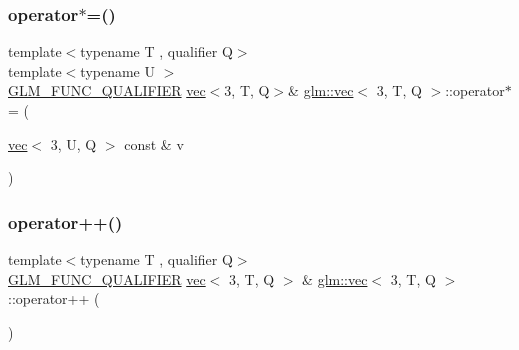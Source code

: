 \mbox{\label{structglm_1_1vec_3_013_00_01_t_00_01_q_01_4_a20170b8b71ce0a479ea43b5d4690a1a5}} 
\subsubsection{\texorpdfstring{operator$\ast$=()}{operator*=()}\hspace{0.1cm}{\footnotesize\ttfamily [6/6]}}
{\footnotesize\ttfamily template$<$typename T , qualifier Q$>$ \\
template$<$typename U $>$ \\
\mbox{\hyperlink{setup_8hpp_a33fdea6f91c5f834105f7415e2a64407}{G\+L\+M\+\_\+\+F\+U\+N\+C\+\_\+\+Q\+U\+A\+L\+I\+F\+I\+ER}} \mbox{\hyperlink{structglm_1_1vec}{vec}}$<$3, T, Q$>$\& \mbox{\hyperlink{structglm_1_1vec}{glm\+::vec}}$<$ 3, T, Q $>$\+::operator$\ast$= (\begin{DoxyParamCaption}\item[{\mbox{\hyperlink{structglm_1_1vec}{vec}}$<$ 3, U, Q $>$ const \&}]{v }\end{DoxyParamCaption})}

\mbox{\label{structglm_1_1vec_3_013_00_01_t_00_01_q_01_4_a5815270bfae62e24ed90c95b1054cd9d}} 
\subsubsection{\texorpdfstring{operator++()}{operator++()}\hspace{0.1cm}{\footnotesize\ttfamily [1/2]}}
{\footnotesize\ttfamily template$<$typename T , qualifier Q$>$ \\
\mbox{\hyperlink{setup_8hpp_a33fdea6f91c5f834105f7415e2a64407}{G\+L\+M\+\_\+\+F\+U\+N\+C\+\_\+\+Q\+U\+A\+L\+I\+F\+I\+ER}} \mbox{\hyperlink{structglm_1_1vec}{vec}}$<$ 3, T, Q $>$ \& \mbox{\hyperlink{structglm_1_1vec}{glm\+::vec}}$<$ 3, T, Q $>$\+::operator++ (\begin{DoxyParamCaption}{ }\end{DoxyParamCaption})}

